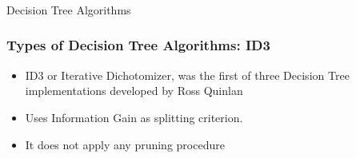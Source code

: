 %
%
%
%
%
\begin{frame}[fragile]\frametitle{}
\begin{center}
{\Large Decision Tree Algorithms}
\end{center}
\end{frame}


\begin{frame}[fragile] \frametitle{Types of Decision Tree Algorithms: ID3}
\begin{itemize}
\item ID3 or Iterative Dichotomizer, was the first of three Decision Tree implementations developed by Ross Quinlan
\item Uses Information Gain as splitting criterion. 
\item It does not apply any pruning procedure
\end{itemize}
\end{frame}

